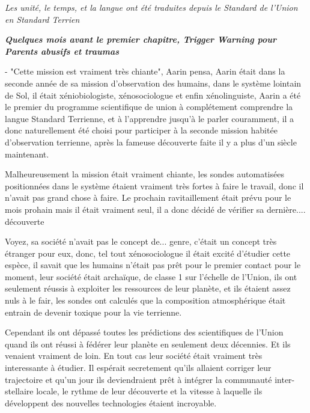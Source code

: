 \documentclass[12pt,hidelinks,a4paper]{book}
\begin{document}
\textit{Les unité, le temps, et la langue ont été traduites depuis le Standard de l'Union en Standard Terrien}\par
\textit{\textbf{Quelques mois avant le premier chapitre, Trigger Warning pour Parents abusifs et traumas}}\par
\bigskip
- "Cette mission est vraiment très chiante", Aarin pensa, 
Aarin était dans la seconde année de sa mission d'observation des humains, dans le système lointain de Sol,
il était xéniobiologiste, xénosociologue et enfin xénolinguiste, 
Aarin a été le premier du programme scientifique de \gls{union} à complétement comprendre 
la langue Standard Terrienne, et à l'apprendre jusqu'à le parler couramment,
il a donc naturellement été choisi pour participer à la seconde mission habitée d'observation terrienne,
après la fameuse découverte faite il y a plus d'un siècle maintenant.\par
\bigskip

Malheureusement la mission était vraiment chiante, les sondes automatisées positionnées dans le système étaient vraiment
très fortes à faire le travail, donc il n'avait pas grand chose à faire. Le prochain ravitaillement était 
prévu pour le mois prohain mais il était vraiment seul, il a donc décidé de vérifier sa dernière.... découverte\par
\bigskip

Voyez, sa société n'avait pas le concept de... genre, c'était un concept très étranger pour eux, donc, 
tel tout xénosociologue il était excité d'étudier cette espèce, il savait que les humains n'était pas 
prêt pour le premier contact pour le moment, leur société était archaïque, de classe 1 sur l'échelle de l'Union, 
ils ont seulement réussis à exploiter les ressources de leur planète, et ils étaient assez nuls à le fair, les sondes 
ont calculés que la composition atmosphérique était entrain de devenir toxique pour la vie terrienne.\par 
\bigskip

Cependant ils ont dépassé toutes les prédictions des scientifiques de l'Union quand ils ont réussi à fédérer leur planète 
en seulement deux décennies. Et ils venaient vraiment de loin. En tout cas leur société était vraiment très interessante 
à étudier. Il espérait secretement qu'ils allaient corriger leur trajectoire et qu'un jour ils deviendraient prêt à intégrer
la communauté inter-stellaire locale, le rythme de leur découverte et la vitesse à laquelle ils développent des nouvelles 
technologies étaient incroyable.\par 
\bigskip
\end{document}
